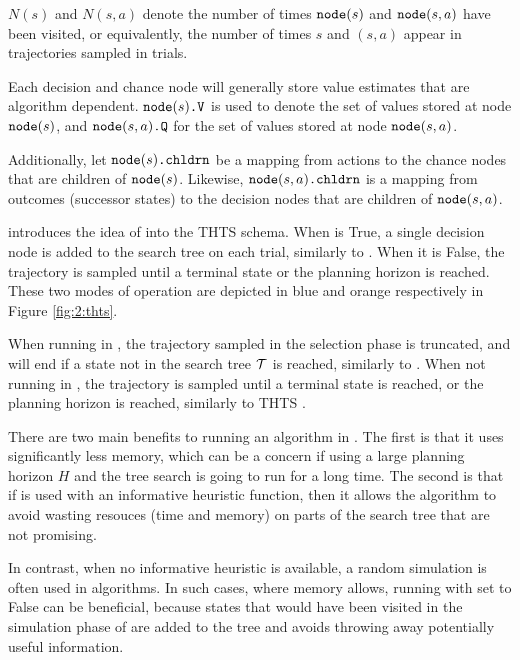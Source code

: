             $N(s)$ and $N(s,a)$ denote the number of times ${\textnormal{\texttt{node}}}(s)$ and ${\textnormal{\texttt{node}}}(s,a)$ have been visited, or equivalently, the number of times $s$ and $(s,a)$ appear in trajectories sampled in \thtspp\ewe trials.

            Each decision and chance node will generally store value estimates that are algorithm dependent. ${{\textnormal{\texttt{node}}}(s)\textnormal{\texttt{.V}}}$ is used to denote the set of values stored at node ${\textnormal{\texttt{node}}}(s)$, and ${{\textnormal{\texttt{node}}}(s,a)\textnormal{\texttt{.Q}}}$ for the set of values stored at node ${\textnormal{\texttt{node}}}(s,a)$. 

            Additionally, let ${\textnormal{\texttt{node}}}(s){\textnormal{\texttt{.chldrn}}}$ be a mapping from actions to the chance nodes that are children of ${\textnormal{\texttt{node}}}(s)$. Likewise, ${\textnormal{\texttt{node}}}(s,a){\textnormal{\texttt{.chldrn}}}$ is a mapping from outcomes (successor states) to the decision nodes that are children of ${\textnormal{\texttt{node}}}(s,a)$.

        \thtspp\ewe introduces the idea of \mctsmode\ewe into the THTS schema. When \mctsmode\ewe is True, a single decision node is added to the search tree on each trial, similarly to \mctsone. When it is False, the trajectory is sampled until a terminal state or the planning horizon is reached. These two modes of operation are depicted in blue and orange respectively in Figure \ref{fig:2:thts}.
        \begin{defn}
            \label{def:2:mctsmode}
            When running in \mctsmode, the trajectory sampled in the selection phase is truncated, and will end if a state not in the search tree $\mathcal{T}$ is reached, similarly to \mctsone\ewe \cite{mcts_survey}. When not running in \mctsmode, the trajectory is sampled until a terminal state is reached, or the planning horizon is reached, similarly to THTS \cite{thts}. 
        \end{defn} 

        There are two main benefits to running an algorithm in \mctsmode. The first is that it uses significantly less memory, which can be a concern if using a large planning horizon $H$ and the tree search is going to run for a long time. The second is that if \mctsmode\ewe is used with an informative heuristic function, then it allows the algorithm to avoid wasting resouces (time and memory) on parts of the search tree that are not promising. 
        
        In contrast, when no informative heuristic is available, a random simulation is often used in \mctsone\ewe algorithms. In such cases, where memory allows, running with \mctsmode\ewe set to False can be beneficial, because states that would have been visited in the simulation phase of \mctsone\ewe are added to the tree and avoids throwing away potentially useful information.

